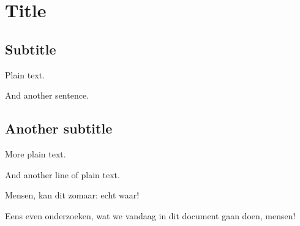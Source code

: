 \documentclass{article}
\begin{document}
\section{Title}


\subsection{Subtitle}

Plain text.

And another sentence.

\subsection{Another subtitle}

More plain text.

And another line of plain text.

Mensen, kan dit zomaar: echt waar!

Eens even onderzoeken, wat we vandaag in dit document gaan doen, mensen!
\end{document}

